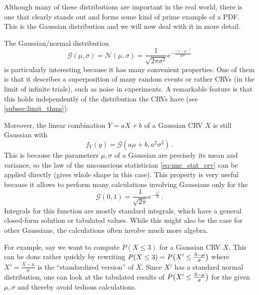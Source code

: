 Although many of these distributions are important in the real world, there is one that clearly stands out and forms some kind of prime example of a PDF. This is the Gaussian distribution and we will now deal with it in more detail.

\begin{ex}
The Gaussian/normal distribution
\begin{equation*}
\mathcal{G}(\mu, \sigma) = \mathcal{N}(\mu, \sigma) = \frac{1}{\sqrt{2 \pi \sigma^2}} e^{- \frac{(x - \mu)^2}{2\sigma^2}}
\end{equation*}
is particularly interesting because it has many convenient properties. One of them is that it describes a superposition of many random events or rather CRVs (in the limit of infinite trials), such as noise in experiments. A remarkable feature is that this holds independently of the distribution the CRVs have (see \ref{subsec:limit_thms}).

Moreover, the linear combination $Y = a X + b$ of a Gaussian CRV $X$ is still Gaussian with
\begin{equation}
f_Y(y) = \mathcal{G}(a \mu + b, a^2 \sigma^2) \, .
\end{equation}
This is because the parameters $\mu, \sigma$ of a Gaussian are precisely its mean and variance, so the law of the unconscious statistician \eqref{eq:unc_stat_crv} can be applied directly (gives whole shape in this case). This property is very useful because it allows to perform many calculations involving Gaussians only for the 
\begin{equation}
\mathcal{G}(0, 1) = \frac{1}{\sqrt{2 \pi}} e^{- \frac{x^2}{2}} \, .
\end{equation}
Integrals for this function are mostly standard integrals, which have a general closed-form solution or tabulated values. While this might also be the case for other Gaussians, the calculations often involve much more algebra.

For example, say we want to compute $P(X \leq 3)$ for a Gaussian CRV $X$. This can be done rather quickly by rewriting $P(X \leq 3) = P\qty(X' \leq \frac{3 - \mu}{\sigma})$ where $X' = \frac{X - \mu}{\sigma}$ is the \enquote{standardized version} of $X$. Since $X'$ has a standard normal distribution, one can look at the tabulated results of $P\qty(X' \leq \frac{3 - \mu}{\sigma})$ for the given $\mu, \sigma$ and thereby avoid tedious calculations.
\end{ex}


